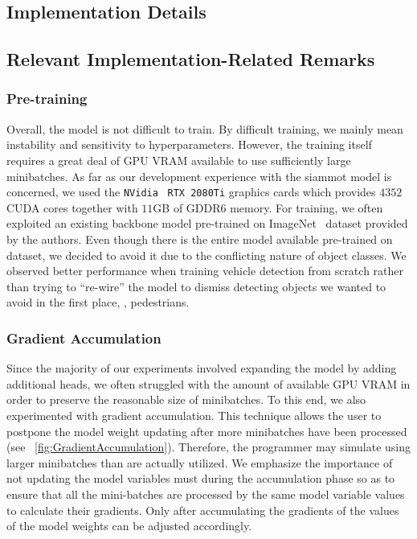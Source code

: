 \subsection{Implementation Details}


\subsection{Relevant Implementation-Related Remarks}

\subsubsection{Pre-training}

Overall, the model is not difficult to train. By difficult training, we mainly mean instability and sensitivity to hyperparameters. However, the training itself requires a great deal of GPU VRAM available to use sufficiently large minibatches. As far as our development experience with the \gls{siammot} model is concerned, we used the \texttt{NVidia}~\cite{webnvidia} \texttt{RTX 2080Ti} graphics cards which provides $4352$ CUDA cores together with $11$GB of GDDR6 memory. For training, we often exploited an existing backbone model pre-trained on ImageNet~\cite{deng2009imagenet} dataset provided by the authors. Even though there is the entire model available pre-trained on \mscoco{}~\cite{lin2014mscoco} dataset, we decided to avoid it due to the conflicting nature of object classes. We observed better performance when training vehicle detection from scratch rather than trying to ``re-wire'' the model to dismiss detecting objects we wanted to avoid in the first place, \egtext{}, pedestrians.

\subsubsection{Gradient Accumulation}

Since the majority of our experiments involved expanding the model by adding additional heads, we often struggled with the amount of available GPU VRAM in order to preserve the reasonable size of minibatches. To this end, we also experimented with gradient accumulation. This technique allows the user to postpone the model weight updating after more minibatches have been processed (see \figtext{}~\ref{fig:GradientAccumulation}). Therefore, the programmer may simulate using larger minibatches than are actually utilized. We emphasize the importance of not updating the model variables must during the accumulation phase so as to ensure that all the mini-batches are processed by the same model variable values to calculate their gradients. Only after accumulating the gradients of the values of the model weights can be adjusted accordingly.

